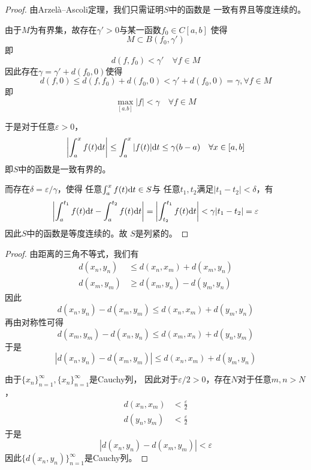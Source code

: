 \documentclass[cn]{homework}
\begin{document}
    \problem
    \begin{proof}
        由Arzelà–Ascoli定理，我们只需证明$S$中的函数是
        一致有界且等度连续的。

        由于$M$为有界集，故存在$\gamma'>0$与某一函数$f_0\in C[a,b]$
        使得
        \[M\subset B(f_0,\gamma')\]
        即
        \[d(f,f_0)<\gamma'\quad\forall f\in M\]
        因此存在$\gamma=\gamma'+d(f_0,0)$使得
        \[d(f,0)\leq d(f,f_0)+d(f_0,0)<\gamma'+d(f_0,0)=\gamma
        ,\forall f\in M\]
        即
        \[\max_{[a.b]}|f|<\gamma\quad\forall f\in M\]
        
        于是对于任意$\varepsilon>0$，
        \[\left|\int_a^xf(t)\mathrm d t\right|
        \leq\int_a^x|f(t)|\mathrm d t
        \leq\gamma(b-a)
        \quad\forall x\in[a,b]\]
        即$S$中的函数是一致有界的。

        而存在$\delta=\varepsilon/\gamma$，使得
        任意$\int_a^xf(t)\mathrm d t\in S$与
        任意$t_1,t_2$满足$|t_1-t_2|<\delta$，有
        \[\left|\int_a^{t_1}f(t)\mathrm d t
        -\int_a^{t_2}f(t)\mathrm d t\right|
        =\left|\int_{t_2}^{t_1}f(t)\mathrm d t\right|
        <\gamma|t_1-t_2|=\varepsilon\]
        因此$S$中的函数是等度连续的。故
        $S$是列紧的。
    \end{proof}

    \problem
    \begin{proof}
        由距离的三角不等式，我们有
        \begin{align*}
            d(x_n,y_n)&\leq d(x_n,x_m)+d(x_m,y_n)\\
            d(x_m,y_m)&\geq d(x_m,y_n)-d(y_m,y_n)
        \end{align*}
        因此
        \[d(x_n,y_n)-d(x_m,y_m)\leq d(x_n,x_m)+d(y_m,y_n)\]
        再由对称性可得
        \[d(x_m,y_m)-d(x_n,y_n)\leq d(x_m,x_n)+d(y_n,y_m)\]
        于是
        \[|d(x_n,y_n)-d(x_m,y_m)|\leq d(x_n,x_m)+d(y_m,y_n)\]
        
        由于$\{x_n\}_{n=1}^\infty,\{x_n\}_{n=1}^\infty$是Cauchy列，
        因此对于$\varepsilon/2>0$，存在$N$对于任意$m,n>N$，
        \begin{align*}
            d(x_n,x_m)&<\frac{\varepsilon}{2}\\
            d(y_n,y_m)&<\frac{\varepsilon}{2}
        \end{align*}
        于是
        \[|d(x_n,y_n)-d(x_m,y_m)|<\varepsilon\]
        因此$\{d(x_n,y_n)\}_{n=1}^\infty$是Cauchy列。
    \end{proof}
\end{document}
